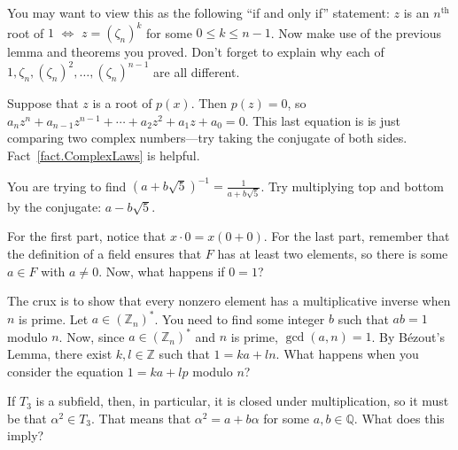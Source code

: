 \begin{hint*}
You may want to view this as the following ``if and only if'' statement: $z$ is an $n^\text{th}$ root of $1$ $\iff$ $z = (\zeta_n)^k$ for some $0\le k\le n-1$. Now make use of the previous lemma and theorems you proved. Don't forget to explain why each of $1, \zeta_n, (\zeta_n)^2, \ldots, (\zeta_n)^{n-1}$ are all different.
\end{hint*}

\begin{hint*}
Suppose that $z$ is a root of $p(x)$. Then $p(z) = 0$, so  $a_nz^n + a_{n-1}z^{n-1} +\cdots+a_2z^2+a_1z+a_0 = 0$. This last equation is is just comparing two complex numbers---try taking the conjugate of both sides. Fact~\ref{fact.ComplexLaws} is helpful.
\end{hint*}

\begin{hint*}
You are trying to find $(a+b\sqrt{5})^{-1} = \frac{1}{a+b\sqrt{5}}$. Try multiplying top and bottom by the conjugate: $a-b\sqrt{5}$.
\end{hint*}

\begin{hint*}
For the first part, notice that $x\cdot0 = x(0+0)$. For the last part, remember that the definition of a field ensures that $F$ has at least two elements, so there is some $a\in F$ with $a\neq 0$. Now, what happens if $0=1$?
\end{hint*}

\begin{hint*}
The crux is to show that every nonzero element has a multiplicative inverse when $n$ is prime. Let $a\in (\mathbb{Z}_n)^*$. You need to find some integer $b$ such that $ab=1$ modulo $n$. Now, since $a\in (\mathbb{Z}_n)^*$ and  $n$ is prime, $\gcd(a,n) = 1$. By B\'ezout's Lemma, there exist $k,l\in \mathbb{Z}$ such that $1 = ka+ln$. What happens when you consider the equation $1 = ka+lp$ modulo $n$?
\end{hint*}

\begin{hint*}
If $T_3$ is a subfield, then, in particular, it is closed under multiplication, so it must be that $\alpha^2\in T_3$. That means that $\alpha^2 = a+b\alpha$ for some $a,b\in \mathbb{Q}$. What does this imply?
\end{hint*}

